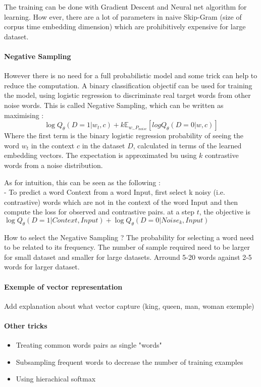 			The training can be done with Gradient Descent and Neural net algorithm for learning. How ever, there are a lot of parameters in naive Skip-Gram (size of corpus time embedding dimension) which are prohibitively expensive for large dataset.

			\paragraph*{Negative Sampling}
				However there is no need for a full probabilistic model and some trick can help to reduce the computation. A binary classification objectif can be used for training the model, using logistic regression to discriminate real target words from other noise words. This is called Negative Sampling, which can be written as maximising : 
				\[
					\log Q_\theta (D=1| w_t, c) + k \mathbb{E}_{w_\sim P_{noise}}[log Q_\theta(D=0 | w, c)]
				\]
				Where the first term is the binary logistic regression probability of seeing the word $w_t$ in the context $c$ in the dataset $D$, calculated in terms of the learned embedding vectors. The expectation is approximated bu using $k$ contrastive words from a noise distribution.

				As for intuition, this can be seen as the following : \\
				- To predict a word Context from a word Input, first select k noisy (i.e. contrastive) words which are not in the context of the word Input and then compute the loss for observed and contrastive pairs. at a step $t$, the objective is $ \log Q_\theta(D=1 | Context, Input) + \log Q_\theta(D=0 | Noise_k, Input)$

				How to select the Negative Sampling ? The probability for selecting a word need to be related to its frequency. The number of sample required need to be larger for small dataset and smaller for large datasets. Arround 5-20 words against 2-5 words for larger dataset. 

			\paragraph*{Exemple of vector representation}
				Add explanation about what vector capture (king, queen, man, woman exemple)
		
			\paragraph*{Other tricks}
				\begin{itemize}
					\item Treating common words pairs as single "words"
					\item Subsampling frequent words to decrease the number of training examples
					\item Using hierachical softmax
				\end{itemize}

